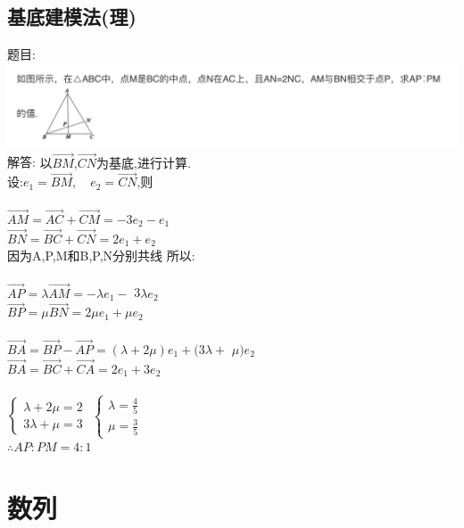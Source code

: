 \documentclass[hyperref, UTF8,11pt,a4paper]{ctexart} %
\begin{document}
\subsection{基底建模法(理)}
{\color{red}  题目: } \\
\includegraphics[width=500pt]  {pic/xiangliang/jidijianmofa.jpg} \\
解答:{\color{blue} 以$\overrightarrow{B M}$,$\overrightarrow{C N}$为基底,进行计算.} \\
设:$e_{1}=\overrightarrow{B M}, \quad e_{2}=\overrightarrow{C N}$,则 \\ \\
$\overrightarrow{A M}=\overrightarrow{A C}+\overrightarrow{C M}=-3 e_{2}-e_{1}$ \\
$\overrightarrow{B N}=\overrightarrow{B C}+\overrightarrow{C N}=2 e_{1}+e_{2}$ \\
因为A,P,M和B,P,N分别共线 所以:\\ \\
$\overrightarrow{A P}=\lambda \overrightarrow{A M}=-\lambda e_{1}-$ 3$\lambda e_{2}$ \\
$\overrightarrow{B P}=\mu \overrightarrow{B N}=2 \mu e_{1}+\mu e_{2}$ \\ \\
$\overrightarrow{B A}=\overrightarrow{B P}-\overrightarrow{A P}=(\lambda+2 \mu) e_{1}+(3 \lambda+$ $\mu ) e_{2}$ \\
$\overrightarrow{B A}=\overrightarrow{B C}+\overrightarrow{C A}=2 e_{1}+3 e_{2}$ \\ \\
$\left\{\begin{array}{l}{\lambda+2 \mu=2} \\ {3 \lambda+\mu=3}\end{array}\right.$
$\left\{\begin{array}{l}{\lambda=\frac{4}{5}} \\ {\mu=\frac{3}{5}}\end{array}\right.$ \\
$\therefore A P : P M=4 : 1$


\newpage
\section{数列}
\end{document}
